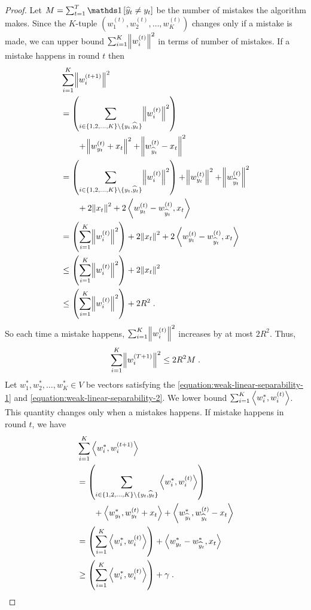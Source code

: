 \begin{proof}
Let $M = \sum_{t=1}^T \indicator{\widehat y_t \neq y_t}$ be the number of
mistakes the algorithm makes. Since the $K$-tuple $(w_1^{(t)}, w_2^{(t)}, \dots,
w_K^{(t)})$ changes only if a mistake is made, we can upper bound $\sum_{i=1}^K
\norm{w_i^{(t)}}^2$ in terms of number of mistakes.
If a mistake happens in round $t$ then
\begin{align*}
& \sum_{i=1}^K \norm{w_i^{(t+1)}}^2 \\
& = \left(\sum_{i \in \{1,2,\dots,K\} \setminus \{y_t, \widehat y_t\} } \norm{w_i^{(t)}}^2 \right) \\
& \qquad + \norm{w_{y_t}^{(t)} + x_t}^2 + \norm{w_{\widehat y_t}^{(t)} - x_t}^2 \\
& = \left(\sum_{i \in \{1,2,\dots,K\} \setminus \{y_t, \widehat y_t\} } \norm{w_i^{(t)}}^2 \right) + \norm{w_{y_t}^{(t)}}^2 + \norm{w_{\widehat y_t}^{(t)}}^2 \\
& \qquad + 2 \norm{x_t}^2 + 2 \left\langle w_{y_t}^{(t)} - w_{\widehat y_t}^{(t)}, x_t \right\rangle \\
& = \left(\sum_{i=1}^K \norm{w_i^{(t)}}^2 \right) + 2 \norm{x_t}^2 + 2 \left\langle w_{y_t}^{(t)} - w_{\widehat y_t}^{(t)}, x_t \right\rangle \\
& \le \left(\sum_{i=1}^K \norm{w_i^{(t)}}^2 \right) + 2 \norm{x_t}^2 \\
& \le \left(\sum_{i=1}^K \norm{w_i^{(t)}}^2 \right) + 2 R^2 \; .
\end{align*}
So each time a mistake happens, $\sum_{i=1}^K \norm{w_i^{(t)}}^2$ increases by at most $2R^2$. Thus,
$$
\sum_{i=1}^K \norm{w_i^{(T+1)}}^2 \le 2R^2 M \; .
$$
Let $w_1^*, w_2^*, \dots, w_K^* \in V$ be vectors satisfying the
\eqref{equation:weak-linear-separability-1} and
\eqref{equation:weak-linear-separability-2}. We lower bound $\sum_{i=1}^K \left\langle w_i^*, w_i^{(t)} \right\rangle$. This quantity changes
only when a mistakes happens. If mistake happens in round $t$, we have
\begingroup
\allowdisplaybreaks
\begin{align*}
& \sum_{i=1}^K \ip{w_i^*}{w_i^{(t+1)}} \\
& = \left( \sum_{i \in \{1,2,\dots,K\} \setminus \{y_t, \widehat y_t\}} \ip{w_i^*}{w_i^{(t)}} \right) \\
& \qquad + \ip{w_{y_t}^*}{w_{y_t}^{(t)} + x_t} + \ip{w_{\widehat y_t}^*}{w_{\widehat y_t}^{(t)} - x_t} \\
& = \left( \sum_{i=1}^K \ip{w_i^*}{w_i^{(t)}} \right) + \ip{w_{y_t}^* - w_{\widehat y_t}^*}{x_t} \\
& \ge  \left( \sum_{i=1}^K \ip{w_i^*}{w_i^{(t)}} \right) + \gamma \; .

\end{align*}
\end{proof}
